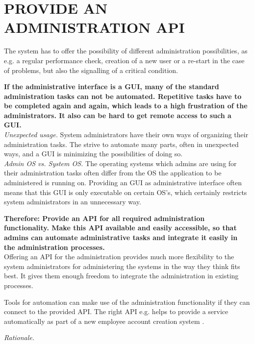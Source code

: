 \newpage
\section*{PROVIDE AN ADMINISTRATION API}

The system has to offer the possibility of different administration possibilities, as e.g. a regular performance check, creation of a new user or a re-start in the case of problems, but also the signalling of a critical condition. 

\begin{center}
  
\end{center}

\textbf{If the administrative interface is a GUI, many of the standard administration tasks can not be automated. Repetitive tasks have to be completed again and again, which leads to a high frustration of the administrators. It also can be hard to get remote access to such a GUI.}\\

\textit{Unexpected usage.} System administrators have their own ways of organizing their administration tasks. The strive to automate many parts, often in unexpected ways, and a GUI is minimizing the possibilities of doing so.\\

\textit{Admin OS vs. System OS.} The operating systems which admins are using for their administration tasks often differ from the OS the application to be administered is running on. Providing an GUI as administrative interface often means that this GUI is only executable on certain OS's, which certainly restricts system administrators in an unnecessary way.

\begin{center}
   
\end{center}

\textbf{Therefore: Provide an API for all required administration functionality. Make this API available and easily accessible, so that admins can automate administrative tasks and integrate it easily in the administration processes.}\\

Offering an API for the administration provides much more flexibility to the system administrators for administering the systems in the way they think fits best. It gives them enough freedom to integrate the administration in existing processes.

Tools for automation can make use of the administration functionality if they can connect to the provided API. The right API e.g. helps to provide a service automatically as part of a new employee account creation system \cite{Limoncelli2011a}.

\begin{center}
   
\end{center}

\textit{Rationale.}
